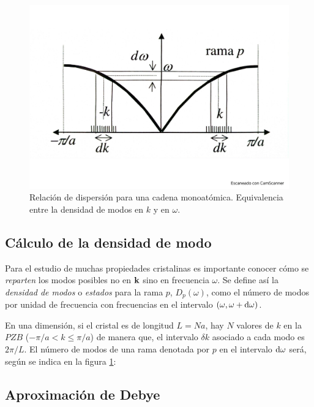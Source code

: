 \begin{figure}[h!] \centering
    \includegraphics[scale=0.5]{Cuerpo/Ch_05/Fotos libro 1.pdf}
    \caption{Relación de dispersión para una cadena monoatómica. Equivalencia entre la densidad de modos en $k$ y en $\omega$.}
    \label{Fig:05-01}
\end{figure}    


\subsection{Cálculo de la densidad de modo}

Para el estudio de muchas propiedades cristalinas es importante conocer cómo se \textit{reparten} los modos posibles no en $\mathbf{k}$ sino en frecuencia $\omega$. Se define así la \textit{densidad de modos} o \textit{estados} para la rama $p$, $D_p (\omega)$, como el número de modos por unidad de frecuencia con frecuencias en el intervalo $(\omega,\omega+\mathrm{d} \omega)$.

En una dimensión, si el cristal es de longitud $L=Na$, hay $N$ valores de $k$ en la $PZB$ ($-\pi/a < k\leq \pi/a$) de manera que, el intervalo $\delta k$ asociado a cada modo es $2 \pi / L$. El número de modos de una rama denotada por $p$ en el intervalo $\mathrm{d} \omega$ será, según se indica en la figura \ref{Fig:05-01}:

 
\subsection{Aproximación de Debye}

